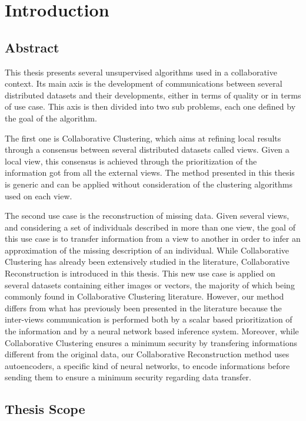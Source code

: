 \chapter{Introduction}

\minitoc{}
\newpage

\section{Abstract}

This thesis presents several unsupervised algorithms used in a collaborative context. Its main axis is the development of communications between several distributed datasets and their developments, either in terms of quality or in terms of use case. This axis is then divided into two sub problems, each one defined by the goal of the algorithm.

The first one is Collaborative Clustering, which aims at refining local results through a consensus between several distributed datasets called views. Given a local view, this consensus is achieved through the prioritization of the information got from all the external views. The method presented in this thesis is generic and can be applied without consideration of the clustering algorithms used on each view.

The second use case is the reconstruction of missing data. Given several views, and considering a set of individuals described in more than one view, the goal of this use case is to transfer information from a view to another in order to infer an approximation of the missing description of an individual. While Collaborative Clustering has already been extensively studied in the literature, Collaborative Reconstruction is introduced in this thesis. This new use case is applied on several datasets containing either images or vectors, the majority of which being commonly found in Collaborative Clustering literature. However, our method differs from what has previously been presented in the literature because the inter-views communication is performed both by a scalar based prioritization of the information and by a neural network based inference system. Moreover, while Collaborative Clustering ensures a minimum security by transfering informations different from the original data, our Collaborative Reconstruction method uses autoencoders, a specific kind of neural networks, to encode informations before sending them to ensure a minimum security regarding data transfer.

\section{Thesis Scope}

